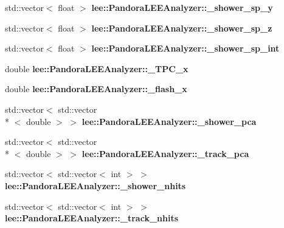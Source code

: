 \begin{DoxyCompactItemize}
\item 
\hypertarget{group__lee_ga9e5b48ceffc6507a180a4c4bd9c0e6f3}{std\-::vector$<$ float $>$ {\bfseries lee\-::\-Pandora\-L\-E\-E\-Analyzer\-::\-\_\-shower\-\_\-sp\-\_\-y}}\label{group__lee_ga9e5b48ceffc6507a180a4c4bd9c0e6f3}

\item 
\hypertarget{group__lee_gad646e6376b43c3ed568725ae55e6b788}{std\-::vector$<$ float $>$ {\bfseries lee\-::\-Pandora\-L\-E\-E\-Analyzer\-::\-\_\-shower\-\_\-sp\-\_\-z}}\label{group__lee_gad646e6376b43c3ed568725ae55e6b788}

\item 
\hypertarget{group__lee_ga84b0714b78e775a1ed838971a1f71a49}{std\-::vector$<$ float $>$ {\bfseries lee\-::\-Pandora\-L\-E\-E\-Analyzer\-::\-\_\-shower\-\_\-sp\-\_\-int}}\label{group__lee_ga84b0714b78e775a1ed838971a1f71a49}

\item 
\hypertarget{group__lee_ga8c55bb8de6e184c1adbc191f3d6f12d5}{double {\bfseries lee\-::\-Pandora\-L\-E\-E\-Analyzer\-::\-\_\-\-T\-P\-C\-\_\-x}}\label{group__lee_ga8c55bb8de6e184c1adbc191f3d6f12d5}

\item 
\hypertarget{group__lee_ga5d01876afb52464a4e5f508f58f1f2cc}{double {\bfseries lee\-::\-Pandora\-L\-E\-E\-Analyzer\-::\-\_\-flash\-\_\-x}}\label{group__lee_ga5d01876afb52464a4e5f508f58f1f2cc}

\item 
\hypertarget{group__lee_ga5ed991b6864eb5cfbfb10298ec9cfc64}{std\-::vector$<$ std\-::vector\\*
$<$ double $>$ $>$ {\bfseries lee\-::\-Pandora\-L\-E\-E\-Analyzer\-::\-\_\-shower\-\_\-pca}}\label{group__lee_ga5ed991b6864eb5cfbfb10298ec9cfc64}

\item 
\hypertarget{group__lee_ga9959360c0dd79addecff84a12dba3d49}{std\-::vector$<$ std\-::vector\\*
$<$ double $>$ $>$ {\bfseries lee\-::\-Pandora\-L\-E\-E\-Analyzer\-::\-\_\-track\-\_\-pca}}\label{group__lee_ga9959360c0dd79addecff84a12dba3d49}

\item 
\hypertarget{group__lee_gaabf1f57f8aef33cad913d8597e68ae52}{std\-::vector$<$ std\-::vector$<$ int $>$ $>$ {\bfseries lee\-::\-Pandora\-L\-E\-E\-Analyzer\-::\-\_\-shower\-\_\-nhits}}\label{group__lee_gaabf1f57f8aef33cad913d8597e68ae52}

\item 
\hypertarget{group__lee_ga4dc8bfc10c4854c7bb093bdee63291e9}{std\-::vector$<$ std\-::vector$<$ int $>$ $>$ {\bfseries lee\-::\-Pandora\-L\-E\-E\-Analyzer\-::\-\_\-track\-\_\-nhits}}\label{group__lee_ga4dc8bfc10c4854c7bb093bdee63291e9}

\end{DoxyCompactItemize}


